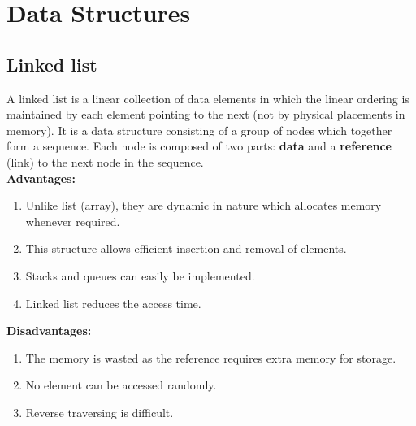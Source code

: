 \documentclass[a4paper,11pt]{book}
\begin{document}
\chapter{Data Structures}

\section{Linked list}

A linked list is a linear collection of data elements in which the linear ordering is maintained by each element pointing to the next (not by physical placements in memory). It is a data structure consisting of a group of nodes which together form a sequence. Each node is composed of two parts: \textbf{data} and a \textbf{reference} (link) to the next node in the sequence.\\

\textbf{Advantages:}
\begin{enumerate}
	\item Unlike list (array), they are dynamic in nature which allocates memory whenever required.
	\item This structure allows efficient insertion and removal of elements.
	\item Stacks and queues can easily be implemented.
	\item Linked list reduces the access time.
\end{enumerate}

\textbf{Disadvantages:}
\begin{enumerate}
	\item The memory is wasted as the reference requires extra memory for storage.
	\item No element can be accessed randomly.
	\item Reverse traversing is difficult.
\end{enumerate}
\end{document}

